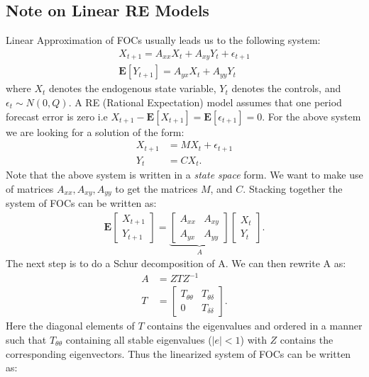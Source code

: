 \documentclass[12pt]{article}
\begin{document}
\subsection{Note on Linear RE Models}\label{note_RE}
Linear Approximation of FOCs usually leads us to the following system:
\begin{align*}
X_{t+1} = A_{xx}X_t + A_{xy}Y_t + \epsilon_{t+1}\\
\mathbf{E}[Y_{t+1}] = A_{yx} X_t + A_{yy}Y_t
\end{align*}
where $X_t$ denotes the endogenous state variable, $Y_t$ denotes the controls, and $\epsilon_t \sim N(0, Q)$. A RE (Rational Expectation) model assumes that one period forecast error is zero i.e  $X_{t+1} - \mathbf{E}[X_{t+1}] = \mathbf{E}[\epsilon_{t+1}] = 0.$ For the above system we are looking for a solution of the form:
\begin{align*}
X_{t+1} & = M X_t + \epsilon_{t+1} \\
Y_t & = C X_t .
\end{align*} 
Note that the above system is written in a \textit{state space} form. We want to make use of matrices $A_{xx}, A_{xy}, A_{yy}$ to get the matrices $M$, and $C$. Stacking together the system of FOCs can be written as:
\begin{align*}
\mathbf{E}\begin{bmatrix} X_{t+1} \\ Y_{t+1} \end{bmatrix} = \underbrace{\begin{bmatrix} A_{xx} & A_{xy} \\ A_{yx} & A_{yy}\end{bmatrix}}_A  \begin{bmatrix} X_{t} \\ Y_{t} \end{bmatrix}.
\end{align*}
The next step is to do a Schur decomposition of A. We can then rewrite A as:
\begin{align*}
A & = ZTZ^{-1} \\
T & = \begin{bmatrix} T_{\theta \theta} & T_{\theta \delta} \\ 0 & T_{\delta \delta} \end{bmatrix}.
\end{align*}
Here the diagonal elements of $T$ contains the eigenvalues and ordered in a manner such that $T_{\theta\theta}$ containing all stable eigenvalues ($|e| < 1$) with $Z$ contains the corresponding eigenvectors. Thus the linearized system of FOCs can be written as:
\end{document}
